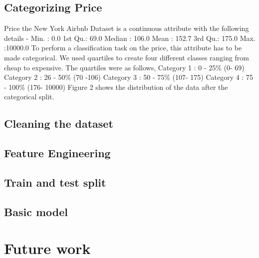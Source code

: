 \documentclass{sig-alternate}
\begin{document}
	\subsection{Categorizing Price}
	Price the New York Airbnb Dataset is a continuous attribute with the following details - \newline
	 Min.   :    0.0  \newline
	1st Qu.:   69.0  \newline
	Median :  106.0  \newline
	Mean   :  152.7  \newline
	3rd Qu.:  175.0  \newline
	Max.   :10000.0  \newline
	To perform a classification task on the price, this attribute has to be made categorical. We used quartiles to create four different classes ranging from cheap to expensive. The quartiles were as follows,
	Category 1 : 0 - 25\% (0- 69) \newline
	Category 2 : 26 - 50\% (70 -106) \newline
	Category 3 : 50 - 75\% (107- 175) \newline
	Category 4 : 75 - 100\% (176- 10000) \newline
	Figure 2 shows the distribution of the data after the categorical split. 
	
	\subsection{Cleaning the dataset}
	\subsection{Feature Engineering} 
	\subsection{Train and test split}
	\subsection{Basic model}
	
	\section{Future work} 
	
	
\end{document}
